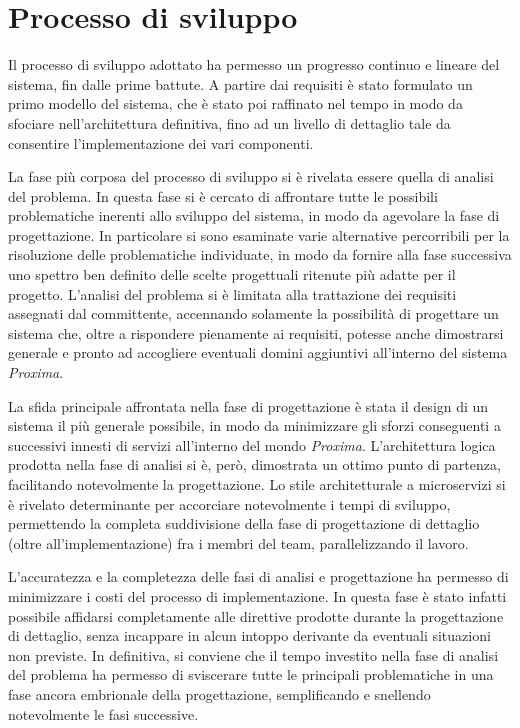 \documentclass[a4paper,12pt]{report}
\begin{document}
\section{Processo di sviluppo}
Il processo di sviluppo adottato ha permesso un progresso continuo e lineare del sistema, fin dalle prime battute. A partire dai requisiti è stato formulato un primo modello del sistema, che è stato poi raffinato nel tempo in modo da sfociare nell'architettura definitiva, fino ad un livello di dettaglio tale da consentire l'implementazione dei vari componenti. 

La fase più corposa del processo di sviluppo si è rivelata essere quella di analisi del problema. In questa fase si è cercato di affrontare tutte le possibili problematiche inerenti allo sviluppo del sistema, in modo da agevolare la fase di progettazione. In particolare si sono esaminate varie alternative percorribili per la risoluzione delle problematiche individuate, in modo da fornire alla fase successiva uno spettro ben definito delle scelte progettuali ritenute più adatte per il progetto. L'analisi del problema si è limitata alla trattazione dei requisiti assegnati dal committente, accennando solamente la possibilità di progettare un sistema che, oltre a rispondere pienamente ai requisiti, potesse anche dimostrarsi generale e pronto ad accogliere eventuali domini aggiuntivi all'interno del sistema \emph{Proxima}. 

La sfida principale affrontata nella fase di progettazione è stata il design di un sistema il più generale possibile, in modo da minimizzare gli sforzi conseguenti a successivi innesti di servizi all'interno del mondo \emph{Proxima}. L'architettura logica prodotta nella fase di analisi si è, però, dimostrata un ottimo punto di partenza, facilitando notevolmente la progettazione. Lo stile architetturale a microservizi si è rivelato determinante per accorciare notevolmente i tempi di sviluppo, permettendo la completa suddivisione della fase di progettazione di dettaglio (oltre all'implementazione) fra i membri del team, parallelizzando il lavoro.

L'accuratezza e la completezza delle fasi di analisi e progettazione ha permesso di minimizzare i costi del processo di implementazione. In questa fase è stato infatti possibile affidarsi completamente alle direttive prodotte durante la progettazione di dettaglio, senza incappare in alcun intoppo derivante da eventuali situazioni non previste. In definitiva, si conviene che il tempo investito nella fase di analisi del problema ha permesso di sviscerare tutte le principali problematiche in una fase ancora embrionale della progettazione, semplificando e snellendo notevolmente le fasi successive.
\end{document}
